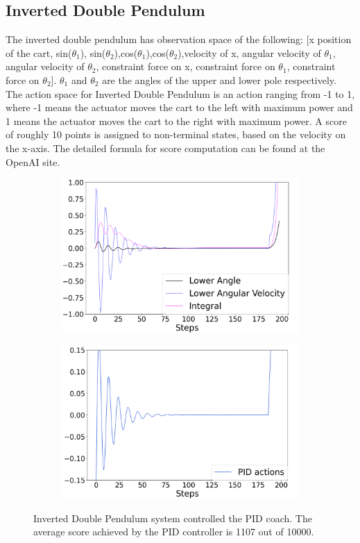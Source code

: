\documentclass{IJCAS}
\begin{document}
\subsection{Inverted Double Pendulum}
The inverted double pendulum has observation space of the following: [x position of the cart, sin($\theta_1$), sin($\theta_2$),cos($\theta_1$),cos($\theta_2$),velocity of x, angular velocity of $\theta_1$, angular velocity of $\theta_2$, constraint force on x, constraint force on $\theta_1$, constraint force on $\theta_2$]. $\theta_1$ and $\theta_2$ are the angles of the upper and lower pole respectively. The action space for Inverted Double Pendulum is an action ranging from -1 to 1, where -1 means the actuator moves the cart to the left with maximum power and 1 means the actuator moves the cart to the right with maximum power. A score of roughly 10 points is assigned to non-terminal states, based on the velocity on the x-axis. The detailed formula for score computation can be found at the OpenAI site.

\begin{figure}[H]
\centering
\begin{subfigure}{0.25\textwidth}
\centering
\includegraphics[width=\linewidth]{double_PID.png}
\end{subfigure}%
\begin{subfigure}{.25\textwidth}
\centering
\includegraphics[width=\linewidth]{double_PID_actions.png}
\end{subfigure}
\caption{Inverted Double Pendulum system controlled the PID coach. The average score achieved by the PID controller is 1107 out of 10000. }
\label{fig:double}
\end{figure}
\end{document}
